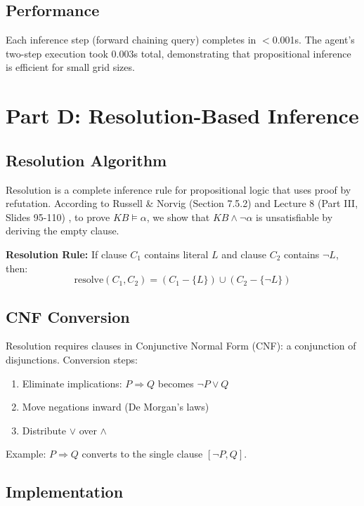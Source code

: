 \documentclass[letterpaper]{article}
\begin{document}
\subsection{Performance}

Each inference step (forward chaining query) completes in $<$0.001s. The agent's two-step execution took 0.003s total, demonstrating that propositional inference is efficient for small grid sizes.

\section{Part D: Resolution-Based Inference}

\subsection{Resolution Algorithm}

Resolution is a complete inference rule for propositional logic that uses proof by refutation. According to Russell \& Norvig (Section 7.5.2) and Lecture 8 (Part III, Slides 95-110) \cite{russell2020artificial,atyabi2025lecture8}, to prove $KB \models \alpha$, we show that $KB \wedge \neg\alpha$ is unsatisfiable by deriving the empty clause.

\textbf{Resolution Rule:} If clause $C_1$ contains literal $L$ and clause $C_2$ contains $\neg L$, then:
\begin{equation}
\text{resolve}(C_1, C_2) = (C_1 - \{L\}) \cup (C_2 - \{\neg L\})
\end{equation}

\subsection{CNF Conversion}

Resolution requires clauses in Conjunctive Normal Form (CNF): a conjunction of disjunctions. Conversion steps:

\begin{enumerate}
\item Eliminate implications: $P \Rightarrow Q$ becomes $\neg P \vee Q$
\item Move negations inward (De Morgan's laws)
\item Distribute $\vee$ over $\wedge$
\end{enumerate}

Example: $P \Rightarrow Q$ converts to the single clause $[\neg P, Q]$.

\subsection{Implementation}
\end{document}

